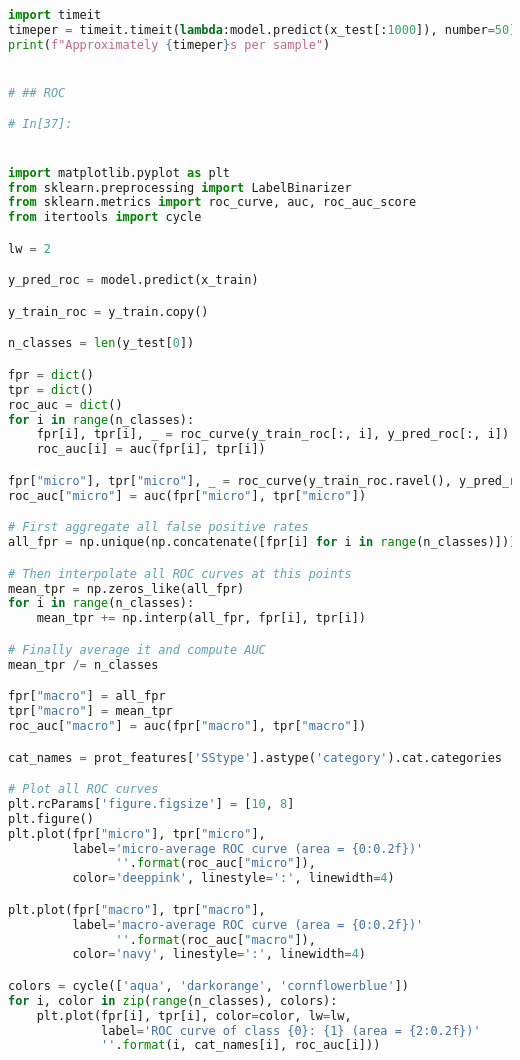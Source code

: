 \documentclass[12pt,letterpaper,oneside,reqno]{book}
\theoremstyle{plain}
\theoremstyle{definition}
\theoremstyle{plain}
\theoremstyle{remark}
\theoremstyle{plain}
\theoremstyle{definition}
\theoremstyle{plain}
\begin{document}
\begin{appendices}
\begin{lstlisting}[language=Python, label=lst:3classdcnnfull, frame=single]
import timeit
timeper = timeit.timeit(lambda:model.predict(x_test[:1000]), number=50)/50000
print(f"Approximately {timeper}s per sample")


# ## ROC

# In[37]:


import matplotlib.pyplot as plt 
from sklearn.preprocessing import LabelBinarizer
from sklearn.metrics import roc_curve, auc, roc_auc_score
from itertools import cycle

lw = 2

y_pred_roc = model.predict(x_train)

y_train_roc = y_train.copy()

n_classes = len(y_test[0])

fpr = dict()
tpr = dict()
roc_auc = dict()
for i in range(n_classes):
    fpr[i], tpr[i], _ = roc_curve(y_train_roc[:, i], y_pred_roc[:, i])
    roc_auc[i] = auc(fpr[i], tpr[i])

fpr["micro"], tpr["micro"], _ = roc_curve(y_train_roc.ravel(), y_pred_roc.ravel())
roc_auc["micro"] = auc(fpr["micro"], tpr["micro"])

# First aggregate all false positive rates
all_fpr = np.unique(np.concatenate([fpr[i] for i in range(n_classes)]))

# Then interpolate all ROC curves at this points
mean_tpr = np.zeros_like(all_fpr)
for i in range(n_classes):
    mean_tpr += np.interp(all_fpr, fpr[i], tpr[i])

# Finally average it and compute AUC
mean_tpr /= n_classes

fpr["macro"] = all_fpr
tpr["macro"] = mean_tpr
roc_auc["macro"] = auc(fpr["macro"], tpr["macro"])

cat_names = prot_features['SStype'].astype('category').cat.categories

# Plot all ROC curves
plt.rcParams['figure.figsize'] = [10, 8]
plt.figure()
plt.plot(fpr["micro"], tpr["micro"],
         label='micro-average ROC curve (area = {0:0.2f})'
               ''.format(roc_auc["micro"]),
         color='deeppink', linestyle=':', linewidth=4)

plt.plot(fpr["macro"], tpr["macro"],
         label='macro-average ROC curve (area = {0:0.2f})'
               ''.format(roc_auc["macro"]),
         color='navy', linestyle=':', linewidth=4)

colors = cycle(['aqua', 'darkorange', 'cornflowerblue'])
for i, color in zip(range(n_classes), colors):
    plt.plot(fpr[i], tpr[i], color=color, lw=lw,
             label='ROC curve of class {0}: {1} (area = {2:0.2f})'
             ''.format(i, cat_names[i], roc_auc[i]))


\end{lstlisting}
\end{appendices}
\end{document}
